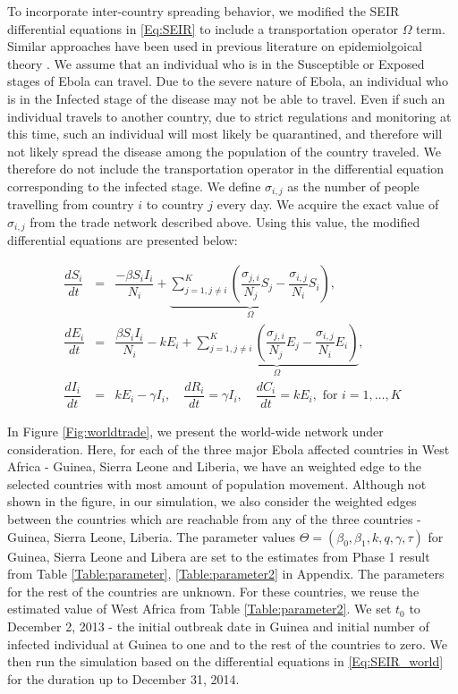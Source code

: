 \documentclass[10pt, journal,onecolumn]{IEEEtran}
\begin{document}
To incorporate inter-country spreading behavior, we modified the SEIR differential equations in
\eqref{Eq:SEIR} to include a transportation operator $\Omega$ term. Similar approaches have been
used in previous literature on epidemiolgoical theory \citep{grais2003assessing,
balcan2010modeling}. We assume that an individual who is in the Susceptible or Exposed stages of
Ebola can travel. Due to the severe nature of Ebola, an individual who is in the Infected stage of
the disease may not be able to travel. Even if such an individual travels to another
country, due to strict regulations and monitoring at this time, such an individual will most likely be
quarantined, and therefore will not likely spread the disease among the population of the country
traveled. We therefore do not include the transportation operator in the differential equation
corresponding to the infected stage. We define $\sigma_{i,j}$ as the number of people travelling from
country $i$ to country $j$ every day. We acquire the exact value of  $\sigma_{i,j}$ from the trade
network described above. Using this value, the modified differential equations are
presented below:

\begin{eqnarray}
\dfrac{dS_{i}}{dt}&=&\dfrac{-\beta S_{i}I_{i}}{N_{i}}+\underset{\Omega}{\underbrace{\sum_{j=1,j\neq i}^{K}\left(\dfrac{\sigma_{j,i}}{N_{j}}S_{j}-\dfrac{\sigma_{i,j}}{N_{i}}S_{i}\right)}},\nonumber \\
\dfrac{dE_{i}}{dt}&=&\dfrac{\beta S_{i}I_{i}}{N_{i}}-kE_{i}+\underset{\Omega}{\underbrace{\sum_{j=1,j\neq i}^{K}\left(\dfrac{\sigma_{j,i}}{N_{j}}E_{j}-\dfrac{\sigma_{i,j}}{N_{i}}E_{i}\right)}},\nonumber \\
\dfrac{dI_{i}}{dt}&=& kE_{i}-\gamma I_{i},
\quad
\dfrac{dR_i}{dt}	=	\gamma I_i,
\quad
\dfrac{dC_i}{dt}	=	kE_i, \text{  for } i=1,\ldots, K
\label{Eq:SEIR_world}
\end{eqnarray}

In Figure \ref{Fig:worldtrade}, we present the world-wide network under consideration. Here, for
each of the three major Ebola affected countries in West Africa - Guinea, Sierra Leone and Liberia,
we have an weighted edge to the selected countries with most amount of population movement. Although
not shown in the figure, in our simulation, we also consider the weighted edges between the
countries which are reachable from any of the three countries -  Guinea, Sierra Leone,  Liberia.
The parameter values $\Theta=(\beta_0,\beta_1,k,q,\gamma, \tau)$ for Guinea, Sierra Leone and Libera
are set to the estimates from Phase 1 result from Table \ref{Table:parameter},
\ref{Table:parameter2} in Appendix. The parameters for the rest of the countries are unknown. For
these countries, we reuse the estimated value of West Africa from Table \ref{Table:parameter2}. We
set $t_0$ to December 2, 2013 - the initial outbreak date in Guinea and initial number of infected
individual at Guinea to one and to the rest of the countries to zero. We then run the simulation
based on the differential equations in \eqref{Eq:SEIR_world} for the duration up to December 31,
2014.
\end{document}
